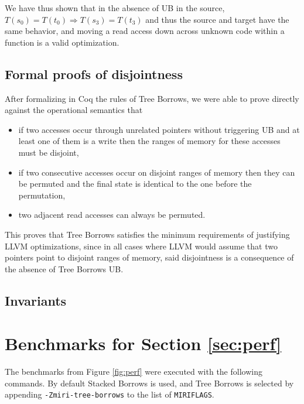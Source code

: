 \documentclass[a4paper,11pt]{article}
\theoremstyle{plain}
\theoremstyle{definition}
\theoremstyle{remark}
\begin{document}
We have thus shown that in the absence of UB in the source,
\(T(s_0) = T(t_0) \Longrightarrow T(s_3) = T(t_3)\) and
thus the source and target have the same behavior, and moving a read access
down across unknown code within a function is a valid optimization.

\subsection{Formal proofs of disjointness}

After formalizing in Coq the rules of Tree Borrows, we were able to prove
directly against the operational semantics that
\begin{itemize}
    \item if two accesses occur through unrelated pointers without triggering UB and at least one of
        them is a write then the ranges of memory for these accesses must be disjoint,
    \item if two consecutive accesses occur on disjoint ranges of memory then they can be permuted
        and the final state is identical to the one before the permutation,
    \item two adjacent read accesses can always be permuted.
\end{itemize}

This proves that Tree Borrows satisfies the minimum requirements of justifying LLVM
optimizations, since in all cases where LLVM would assume that two pointers point
to disjoint ranges of memory, said disjointness is a consequence of the absence of
Tree Borrows UB.


\subsection{Invariants}



\newpage




\appendix

\newpage
\section{Benchmarks for Section \ref{sec:perf}}
\label{app:perf}

The benchmarks from Figure \ref{fig:perf} were executed with the following commands.
By default Stacked Borrows is used, and Tree Borrows is selected by appending
\texttt{-Zmiri-tree-borrows} to the list of \texttt{MIRIFLAGS}.
\end{document}
